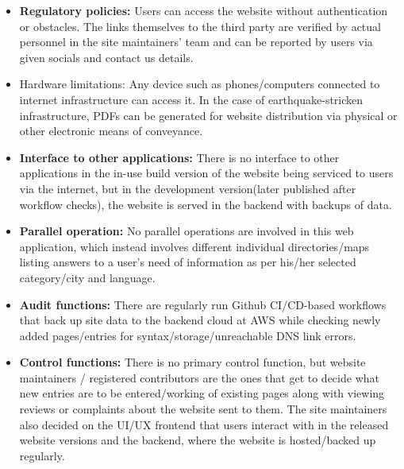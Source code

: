 \begin{itemize}
  \item \textbf{Regulatory policies:} Users can access the website without authentication or obstacles. The links themselves to the third party are verified by actual personnel in the site maintainers' team and can be reported by users via given socials and contact us details.
  \item Hardware limitations: Any device such as phones/computers connected to internet infrastructure can access it. In the case of earthquake-stricken infrastructure, PDFs can be generated for website distribution via physical or other electronic means of conveyance.
  \item \textbf{Interface to other applications:} There is no interface to other applications in the in-use build version of the website being serviced to users via the internet, but in the development version(later published after workflow checks), the website is served in the backend with backups of data.
  \item \textbf{Parallel operation:} No parallel operations are involved in this web application, which instead involves different individual directories/maps listing answers to a user's need of information as per his/her selected category/city and language.
  \item \textbf{Audit functions:} There are regularly run Github CI/CD-based workflows that back up site data to the backend cloud at AWS while checking newly added pages/entries for syntax/storage/unreachable DNS link errors.
  \item \textbf{Control functions:} There is no primary control function, but website maintainers / registered contributors are the ones that get to decide what new entries are to be entered/working of existing pages along with viewing reviews or complaints about the website sent to them. The site maintainers also decided on the UI/UX frontend that users interact with in the released website versions and the backend, where the website is hosted/backed up regularly.
  
  \vspace*{\fill}
  \newpage


\end{itemize}
